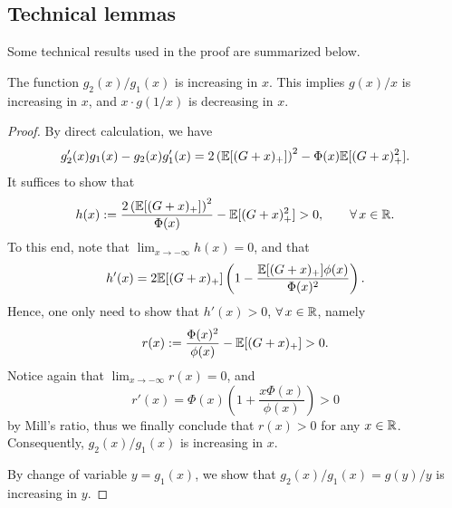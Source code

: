\subsection{Technical lemmas}

Some technical results used in the proof are summarized below.

\begin{lem}\label{lem:g_monotone}
The function $g_2(x) / g_1(x)$ is increasing in $x$. This implies $g(x) / x$ is increasing in $x$, and $x \cdot g(1/x)$ is decreasing in $x$.
\end{lem}
\begin{proof}
	By direct calculation, we have
	\begin{align*}
		g_2'(x) g_1(x) - g_2(x) g_1'(x) = 2 \left( \mathbb{E}[(G + x)_+] \right)^2 - \Phi(x) \mathbb{E}[(G+x)_+^2].
	\end{align*}
	It suffices to show that
	\begin{equation*}
		h(x) := \frac{2 \left( \mathbb{E}[(G + x)_+] \right)^2}{\Phi(x)} - \mathbb{E}[(G+x)_+^2] > 0, \qquad  \forall\, x \in \mathbb{R}.
	\end{equation*}
	To this end, note that $\lim_{x \to - \infty} h(x) = 0$, and that
	\begin{equation*}
		h'(x) = 2 \mathbb{E} [(G + x)_+] \left( 1 - \frac{\mathbb{E} [(G + x)_+] \phi(x)}{\Phi(x)^2} \right).
	\end{equation*}
	Hence, one only need to show that $h'(x) > 0$, $\forall \, x \in \mathbb{R}$, namely
	\begin{equation*}
		r(x) := \frac{\Phi(x)^2}{\phi(x)} - \mathbb{E} [(G + x)_+] > 0.
	\end{equation*}
	Notice again that $\lim_{x \to -\infty} r(x) = 0$, and
	\begin{equation*}
		r'(x) = \Phi(x) \left( 1 + \frac{x \Phi(x)}{\phi(x)} \right) > 0
	\end{equation*}
	by Mill's ratio, thus we finally conclude that $r (x) > 0$ for any $x \in \mathbb{R}$. Consequently, $g_2 (x) / g_1 (x)$ is increasing in $x$.

    By change of variable $y = g_1(x)$, we show that $g_2 (x)/g_1 (x) = g(y)/y$ is increasing in $y$.
\end{proof}





